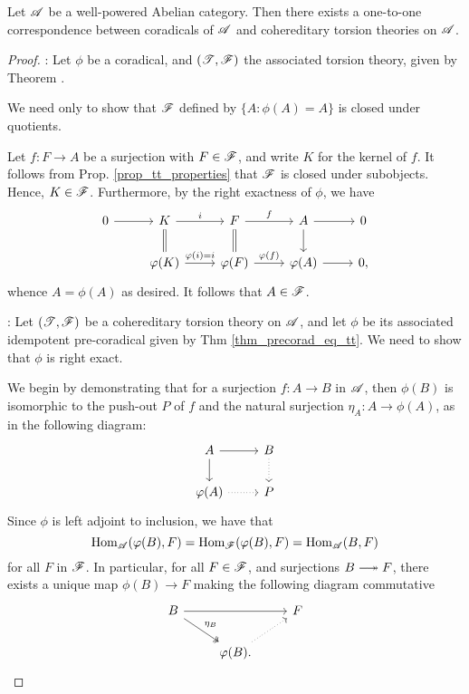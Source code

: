 \begin{thm}\label{thm_corad_equiv_htt}
Let $\mathscr{A}$ be a well-powered Abelian category. Then there 
exists a one-to-one correspondence between coradicals of $\mathscr{A}$ 
and cohereditary torsion theories on $\mathscr{A}$.
\end{thm}
\begin{proof}

 : Let 
$\phi$ be a coradical, and $(\mathscr{T}, \mathscr{F})$ the associated
torsion theory, given by Theorem \cite{thm_precorad_eq_tt}.

We need only to show that $\mathscr{F}$ defined by $\{A : \phi(A) = 
A\}$ is closed under quotients.

Let $f: F \to A$ be a surjection with $F \in \mathscr{F}$,
and write $K$ for the kernel of $f$. It follows from Prop. 
\ref{prop_tt_properties} that $\mathscr{F}$ is closed under 
subobjects. Hence, $K \in \mathscr{F}$. Furthermore, by the right 
exactness of $\phi$, we have
\[
\begin{tikzcd}
0 \arrow{r} & 
K \arrow{r}{i} \arrow[equals]{d} &
F \arrow{r}{f} \arrow[equals]{d} &
A \arrow{r} \arrow{d} &
0 \\
& \phi(K) \arrow{r}{\phi(i) = i} &
\phi(F) \arrow{r}{\phi(f)} &
\phi(A) \arrow{r} &
0,
\end{tikzcd}
\]
whence $A = \phi(A)$ as desired. It follows that $A \in \mathscr{F}$.

 : Let
$(\mathscr{T}, \mathscr{F})$ be a cohereditary torsion theory on $\mathscr{A}$,
and let $\phi$ be its associated idempotent pre-coradical given by 
Thm \ref{thm_precorad_eq_tt}. We need to show that $\phi$ is right 
exact.

We begin by demonstrating that for a surjection $f: A \to B$ in 
$\mathscr{A}$, then $\phi(B)$ is isomorphic to the push-out $P$ of
$f$ and the natural surjection $\eta_A: A \to \phi(A)$, as in the
following diagram:
\[
\begin{tikzcd}
A \arrow{r} \arrow{d} & B \arrow[dotted]{d}\\
\phi(A) \arrow[dotted]{r} & P
\end{tikzcd}
\]
Since $\phi$ is left adjoint to inclusion, we have that
\[
\mathrm{Hom}_{\mathscr{A}}(\varphi(B), F) = \mathrm{Hom}_{\mathscr{F}}(\varphi(B), F) = 
   \mathrm{Hom}_{\mathscr{A}}(B, F)
\]
for all $F$ in $\mathscr{F}$. In particular, for all $F \in
\mathscr{F}$, and surjections $B \onto F$, there exists a unique
map $\phi(B) \to F$ making the following diagram commutative
\[
\begin{tikzcd}
B \arrow[twoheadrightarrow]{rd}{\eta_B} \arrow{rr} & & F \\
&\phi(B) \arrow[dotted]{ru}.
\end{tikzcd}
\]


\end{proof}
